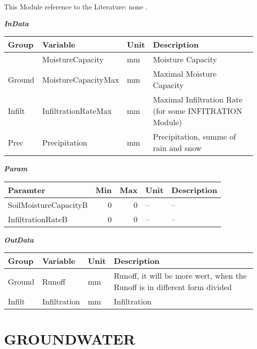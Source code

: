 \documentclass[
]{book}
\begin{document}
This Module reference to the Literature: none \citep{none}.

\textbf{\emph{InData}}

\begin{table}[!h]
\centering
\begin{tabular}{l|l|l|l}
\hline
Group & Variable & Unit & Description\\
\hline
 & MoistureCapacity & mm & Moisture Capacity\\
\cline{2-4}
\multirow{-2}{*}{\raggedright\arraybackslash Ground} & MoistureCapacityMax & mm & Maximal Moisture Capacity\\
\cline{1-4}
Infilt & InfiltrationRateMax & mm & Maximal Infiltration Rate (for some INFITRATION Module)\\
\cline{1-4}
Prec & Precipitation & mm & Precipitation, summe of rain and snow\\
\hline
\end{tabular}
\end{table}

\textbf{\emph{Param}}

\begin{table}[!h]
\centering
\begin{tabular}{l|r|r|l|l}
\hline
Paramter & Min & Max & Unit & Description\\
\hline
SoilMoistureCapacityB & 0 & 0 & -- & --\\
\cline{1-5}
InfiltrationRateB & 0 & 0 & -- & --\\
\hline
\end{tabular}
\end{table}

\textbf{\emph{OutData}}

\begin{table}[!h]
\centering
\begin{tabular}{l|l|l|l}
\hline
Group & Variable & Unit & Description\\
\hline
Ground & Runoff & mm & Runoff, it will be more wert, when the Runoff is in different form divided\\
\cline{1-4}
Infilt & Infiltration & mm & Infiltration\\
\hline
\end{tabular}
\end{table}

\hypertarget{groundwater}{%
\section{GROUNDWATER}\label{groundwater}}
\end{document}
